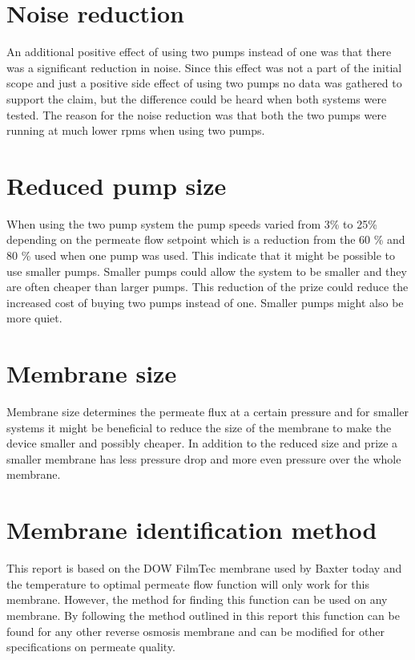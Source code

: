 \section{Noise reduction}

An additional positive effect of using two pumps instead of one was that there was a significant reduction in noise. Since this effect was not a part of the initial scope and just a positive side effect of using two pumps no data was gathered to support the claim, but the difference could be heard when both systems were tested. The reason for the noise reduction was that both the two pumps were running at much lower rpms when using two pumps. 

\section{Reduced pump size}
When using the two pump system the pump speeds varied from 3\% to 25\% depending on the permeate flow setpoint which is a reduction from the 60 \% and 80 \% used when one pump was used. This indicate that it might be possible to use smaller pumps. Smaller pumps could allow the system to be smaller and they are often cheaper than larger pumps. This reduction of the prize could reduce the increased cost of buying two pumps instead of one. Smaller pumps might also be more quiet.

\section{Membrane size}
Membrane size determines the permeate flux at a certain pressure and for smaller systems it might be beneficial to reduce the size of the membrane to make the device smaller and possibly cheaper. In addition to the reduced size and prize a smaller membrane has less pressure drop and more even pressure over the whole membrane.

\section{Membrane identification method}
This report is based on the DOW FilmTec membrane used by Baxter today and the temperature to optimal permeate flow function will only work for this membrane. However, the method for finding this function can be used on any membrane. By following the method outlined in this report this function can be found for any other reverse osmosis membrane and can be modified for other specifications on permeate quality. 

